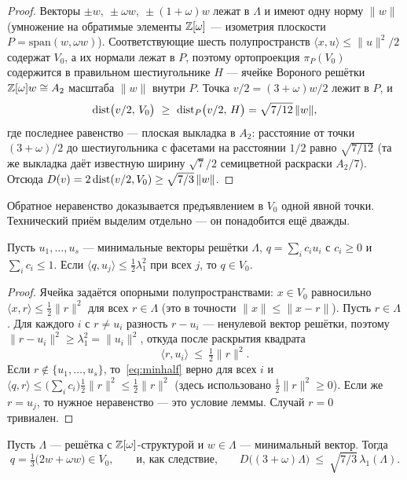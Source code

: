\begin{proof}
Векторы $\pm w,\ \pm\omega w,\ \pm(1+\omega)w$ лежат в $\Lambda$ и имеют одну
норму $\|w\|$ (умножение на обратимые элементы $\mathbb{Z}[\omega]$ --- изометрия
плоскости $P=\mathrm{span}(w,\omega w)$). Соответствующие шесть полупространств
$\langle x,u\rangle\le\|u\|^2/2$ содержат $V_0$, а их нормали лежат в $P$,
поэтому ортопроекция $\pi_P(V_0)$ содержится в правильном шестиугольнике $H$ ---
ячейке Вороного решётки $\mathbb{Z}[\omega]w\cong A_2$ масштаба $\|w\|$ внутри $P$.
Точка $v/2=(3+\omega)w/2$ лежит в $P$, и
\[
\dist\bigl(v/2,\,V_0\bigr)\ \ge\ \dist_P\bigl(v/2,\,H\bigr)
=\sqrt{7/12}\,\|w\|,
\]
где последнее равенство --- плоская выкладка в $A_2$: расстояние от точки
$(3+\omega)/2$ до шестиугольника с фасетами на расстоянии $1/2$ равно
$\sqrt{7/12}$ (та же выкладка даёт известную ширину $\sqrt7/2$ семицветной
раскраски $A_2/7$). Отсюда
$D(v)=2\operatorname{dist}(v/2,V_0)\ge\sqrt{7/3}\,\|w\|$.
\end{proof}

Обратное неравенство доказывается предъявлением в $V_0$ одной явной точки.
Технический приём выделим отдельно --- он понадобится ещё дважды.

\begin{lemma}\label{lem:cellpoint}
Пусть $u_1,\dots,u_s$ --- минимальные векторы решётки $\Lambda$,
$q=\sum_i c_iu_i$ с $c_i\ge0$ и $\sum_ic_i\le1$. Если
$\langle q,u_j\rangle\le\frac12\lambda_1^2$ при всех $j$, то $q\in V_0$.
\end{lemma}

\begin{proof}
Ячейка задаётся опорными полупространствами: $x\in V_0$ равносильно
$\langle x,r\rangle\le\frac12\|r\|^2$ для всех $r\in\Lambda$ (это в точности
$\|x\|\le\|x-r\|$). Пусть $r\in\Lambda$. Для каждого $i$ с $r\ne u_i$ разность
$r-u_i$ --- ненулевой вектор решётки, поэтому
$\|r-u_i\|^2\ge\lambda_1^2=\|u_i\|^2$, откуда после раскрытия квадрата
\begin{equation}\label{eq:minhalf}
\langle r,u_i\rangle\ \le\ \tfrac12\|r\|^2 .
\end{equation}
Если $r\notin\{u_1,\dots,u_s\}$, то~\eqref{eq:minhalf} верно для всех $i$ и
$\langle q,r\rangle\le\bigl(\sum_ic_i\bigr)\frac12\|r\|^2\le\frac12\|r\|^2$
(здесь использовано $\frac12\|r\|^2\ge0$). Если же $r=u_j$, то нужное
неравенство --- это условие леммы. Случай $r=0$ тривиален.
\end{proof}

\begin{proposition}\label{prop:eisup}
Пусть $\Lambda$ --- решётка с $\mathbb{Z}[\omega]$-структурой и
$w\in\Lambda$ --- минимальный вектор. Тогда
\[
q=\tfrac13\bigl(2w+\omega w\bigr)\in V_0,
\qquad\text{и, как следствие,}\qquad
D\bigl((3+\omega)\Lambda\bigr)\ \le\ \sqrt{7/3}\,\lambda_1(\Lambda).
\]
\end{proposition}

